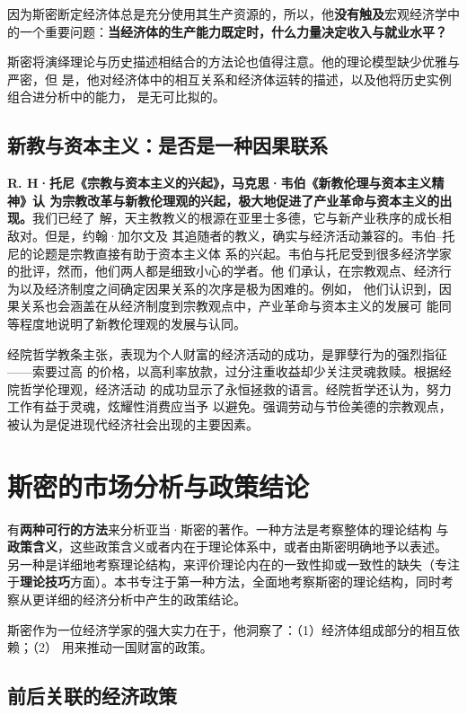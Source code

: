 因为斯密断定经济体总是充分使用其生产资源的，所以，他\textbf{没有触及}宏观经济学中
的一个重要问题：\textbf{当经济体的生产能力既定时，什么力量决定收入与就业水平？}

斯密将演绎理论与历史描述相结合的方法论也值得注意。他的理论模型缺少优雅与严密，但
是，他对经济体中的相互关系和经济体运转的描述，以及他将历史实例组合进分析中的能力，
是无可比拟的。

\subsection{新教与资本主义：是否是一种因果联系}

\textbf{R. H·托尼《宗教与资本主义的兴起》，马克思·韦伯《新教伦理与资本主义精神》认
  为宗教改革与新教伦理观的兴起，极大地促进了产业革命与资本主义的出现。}我们已经了
解，天主教教义的根源在亚里士多德，它与新产业秩序的成长相敌对。但是，约翰·加尔文及
其追随者的教义，确实与经济活动兼容的。韦伯--托尼的论题是宗教直接有助于资本主义体
系的兴起。韦伯与托尼受到很多经济学家的批评，然而，他们两人都是细致小心的学者。他
们承认，在宗教观点、经济行为以及经济制度之间确定因果关系的次序是极为困难的。例如，
他们认识到，因果关系也会涵盖在从经济制度到宗教观点中，产业革命与资本主义的发展可
能同等程度地说明了新教伦理观的发展与认同。

经院哲学教条主张，表现为个人财富的经济活动的成功，是罪孽行为的强烈指征——索要过高
的价格，以高利率放款，过分注重收益却少关注灵魂救赎。根据经院哲学伦理观，经济活动
的成功显示了永恒拯救的语言。经院哲学还认为，努力工作有益于灵魂，炫耀性消费应当予
以避免。强调劳动与节俭美德的宗教观点，被认为是促进现代经济社会出现的主要因素。

\section{斯密的市场分析与政策结论}

有\textbf{两种可行的方法}来分析亚当·斯密的著作。一种方法是考察整体的理论结构
与\textbf{政策含义}，这些政策含义或者内在于理论体系中，或者由斯密明确地予以表述。
另一种是详细地考察理论结构，来评价理论内在的一致性抑或一致性的缺失（专注
于\textbf{理论技巧}方面）。本书专注于第一种方法，全面地考察斯密的理论结构，同时考
察从更详细的经济分析中产生的政策结论。

斯密作为一位经济学家的强大实力在于，他洞察了：（1）经济体组成部分的相互依赖；（2）
用来推动一国财富的政策。

\subsection{前后关联的经济政策}

